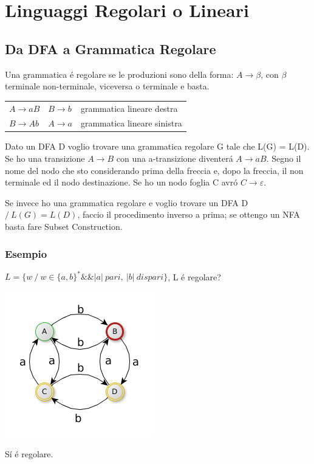 \chapter{Linguaggi Regolari o Lineari}

\section{Da DFA a Grammatica Regolare}

Una grammatica \'e regolare se le produzioni sono della forma: $A \rightarrow \beta$, con $\beta$ terminale non-terminale, viceversa o 
terminale e basta.\\[5pt]

\begin{center}
    \begin{tabular}{lll}
        $A \rightarrow aB$     &    $B \rightarrow b$   &   grammatica lineare destra\\
        $B \rightarrow Ab$     &    $A \rightarrow a$   &   grammatica lineare sinistra\\
    \end{tabular}
\end{center}

Dato un DFA D voglio trovare una grammatica regolare G tale che L(G) = L(D). 
Se ho una transizione $A \rightarrow B$ con una a-transizione diventer\'a $A \rightarrow aB$. Segno il nome del nodo che sto considerando
prima della freccia e, dopo la freccia, il non terminale ed il nodo destinazione. Se ho un nodo foglia C avr\'o  $C \rightarrow \varepsilon$.

Se invece ho una grammatica regolare e voglio trovare un DFA D $/\ L(G) = L(D)$, faccio il procedimento inverso a prima;
se ottengo un NFA basta fare Subset Construction.

\subsection{Esempio}
$L=\{ w \ / \ w \in \{ a, b \} ^* \&\& |a|\ pari,\ |b|\ dispari \}$, L \'e regolare?
\begin{center}
	\includegraphics[scale=0.5]{Chapters/Img/c02_12.png}\\
\end{center} 
S\'i \'e regolare.


